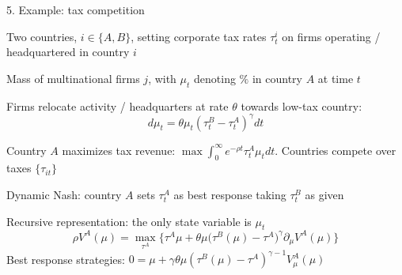 \documentclass[11pt, aspectratio=169]{beamer}
\newenvironment{witemize}{\itemize\addtolength{\itemsep}{10pt}}{\enditemize}
\begin{document}
\begin{frame}{5. Example: tax competition}

{\small
\begin{witemize}
\item Two countries, $i \in \{A, B\}$, setting corporate tax rates $\tau_t^i$ on firms operating / headquartered in country $i$

\item Mass of multinational firms $j$, with $\mu_t$ denoting $\%$ in country $A$ at time $t$

\item Firms relocate activity / headquarters at rate $\theta$ towards low-tax country:
\begin{equation*}
	d \mu_t = \theta \mu_t (\tau_t^B - \tau_t^A)^\gamma dt  
\end{equation*}

\item Country $A$ maximizes tax revenue: $\max \int_0^\infty e^{- \rho t} \tau_t^A \mu_t dt$. Countries compete over taxes $\{ \tau_{it} \}$

\item Dynamic Nash: country $A$ sets $\tau_t^A$ as best response taking $\tau_t^B$ as given 

\item Recursive representation: the only state variable is $\mu_t$
\begin{equation*}
	\rho V^A(\mu) = \max_{\tau^A} \Big\{ \tau^A \mu + \theta \mu \Big( \tau^B(\mu) - \tau^A \Big)^\gamma \partial_\mu V^A(\mu) \Big\}
\end{equation*}
Best response strategies: $0 = \mu + \gamma \theta \mu (\tau^B(\mu) - \tau^A)^{\gamma - 1} V_\mu^A(\mu)$
\end{witemize}
}
\end{frame}
\end{document}
